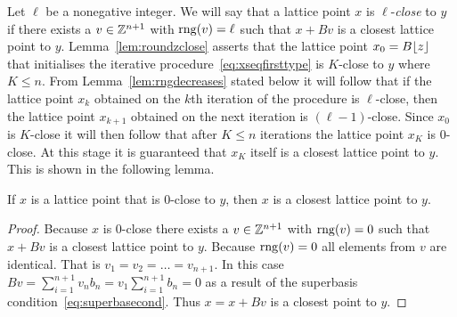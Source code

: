 \documentclass[final,leqno]{siamltex}
\begin{document}
Let $\ell$ be a nonegative integer.  We will say that a lattice point $x$ is $\ell$-\emph{close} to $y$ if there exists a $v \in {\mathbb Z}^{n+1}$ with $\operatorname{rng}(v) = \ell$ such that $x + Bv$ is a closest lattice point to $y$.  Lemma~\ref{lem:roundzclose} asserts that the lattice point $x_0 = B{\left\lfloor z \right\rfloor}$ that initialises the iterative procedure~\eqref{eq:xseqfirsttype} is $K$-close to $y$ where $K \leq n$.  From Lemma~\ref{lem:rngdecreases} stated below it will follow that if the lattice point $x_k$ obtained on the $k$th iteration of the procedure is $\ell$-close, then the lattice point $x_{k+1}$ obtained on the next iteration is $(\ell-1)$-close.  Since $x_0$ is $K$-close it will then follow that after $K \leq n$ iterations the lattice point $x_K$ is $0$-close.  At this stage it is guaranteed that $x_{K}$ itself is a closest lattice point to $y$.  This is shown in the following lemma.  

\begin{lemma}\label{lem:rngzeroclosestpoint}
If $x$ is a lattice point that is $0$-close to $y$, then $x$ is a closest lattice point to $y$.
\end{lemma}
\begin{proof}
Because $x$ is $0$-close there exists a $v \in {\mathbb Z}^{n+1}$ with $\operatorname{rng}(v) = 0$ such that $x + Bv$ is a closest lattice point to $y$.  Because $\operatorname{rng}(v) = 0$ all elements from $v$ are identical.  That is $v_1=v_2=\dots=v_{n+1}$.  In this case $Bv = \sum_{i=1}^{n+1} v_n b_n = v_1\sum_{i=1}^{n+1}b_n = 0$
as a result of the superbasis condition~\eqref{eq:superbasecond}.  Thus $x = x + Bv$ is a closest point to $y$. 
\end{proof}
\end{document}
